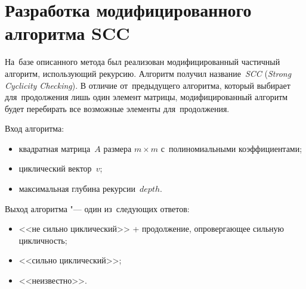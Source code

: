 \section{Разработка модифицированного алгоритма SCC}

На~базе описанного метода был реализован модифицированный частичный алгоритм, использующий рекурсию.
Алгоритм получил название~\emph{SCC}
(\emph{Strong Cyclicity \newline Checking}).
В отличие от~предыдущего алгоритма, который выбирает для~продолжения лишь один элемент матрицы,
модифицированный алгоритм будет перебирать все возможные элементы для~продолжения.

Вход алгоритма:
\begin{itemize}
    \item
        квадратная матрица~$A$ размера $m \times m$ с~полиномиальными коэффициентами;
    \item
        циклический вектор~$v$;
    \item
        максимальная глубина рекурсии~$depth$.
\end{itemize}

Выход алгоритма "--- один из~следующих ответов:
\begin{itemize}
    \item
        <<не сильно циклический>> + продолжение, опровергающее сильную цикличность;
    \item
        <<сильно циклический>>;
    \item
        <<неизвестно>>.
\end{itemize}

